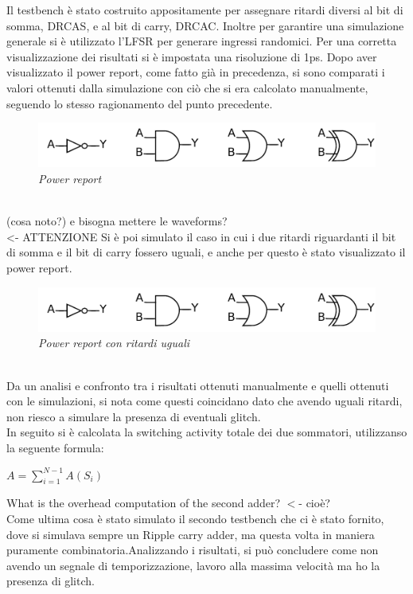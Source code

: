 Il testbench è stato costruito appositamente per assegnare ritardi diversi al bit di somma, DRCAS, e al bit di carry, DRCAC. Inoltre per garantire una simulazione generale si è utilizzato l'LFSR per generare ingressi randomici. Per una corretta visualizzazione dei risultati si è impostata una risoluzione di 1ps. Dopo aver visualizzato il power report, come fatto già in precedenza, si sono comparati i valori ottenuti dalla simulazione con ciò che si era calcolato manualmente, seguendo lo stesso ragionamento del punto precedente.\\
	\begin{figure}[!htb]
		\centering
		\includegraphics[scale=1]{immagini/gate}
		\caption{\textit{Power report}}
		\label{fig1_3}
	\end{figure} \\
	(cosa noto?) e bisogna mettere le waveforms?\\                                <- ATTENZIONE
Si è poi simulato il caso in cui i due ritardi riguardanti il bit di somma e il bit di carry fossero uguali, e anche per questo è stato visualizzato il power report.   
\begin{figure}[!htb]
		\centering
		\includegraphics[scale=1]{immagini/gate}
		\caption{\textit{Power report con ritardi uguali}}
		\label{fig1_4}
	\end{figure} \\
	Da un analisi e confronto tra i risultati ottenuti manualmente e quelli ottenuti con le simulazioni, si nota come questi coincidano dato che avendo uguali ritardi, non riesco a simulare la presenza di eventuali glitch.\\
	In seguito si è calcolata la switching activity totale dei due sommatori, utilizzanso la seguente formula:
	\begin{center}
		$ A=\sum_{i=1}^{N-1}{A(S_i)} $  %
	\end{center}
What is the overhead computation of the second adder?  $<$- cioè? \\
Come ultima cosa è stato simulato il secondo testbench che ci è stato fornito, dove si simulava sempre un Ripple carry adder, ma questa volta in maniera puramente combinatoria.Analizzando i risultati, si può concludere come non avendo un segnale di temporizzazione, lavoro alla massima velocità ma ho la presenza di glitch.

